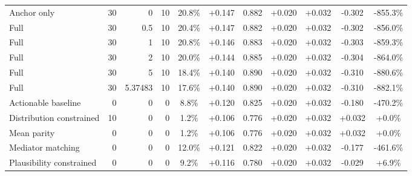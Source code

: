 \begin{table}[htbp]
\begin{tabular}{lrrrccccccc}
Anchor only & 30 & 0 & 10 & 20.8\% & +0.147 & 0.882 & +0.020 & +0.032 & -0.302 & -855.3\% \\
Full & 30 & 0.5 & 10 & 20.4\% & +0.147 & 0.882 & +0.020 & +0.032 & -0.302 & -856.0\% \\
Full & 30 & 1 & 10 & 20.8\% & +0.146 & 0.883 & +0.020 & +0.032 & -0.303 & -859.3\% \\
Full & 30 & 2 & 10 & 20.0\% & +0.144 & 0.885 & +0.020 & +0.032 & -0.304 & -864.0\% \\
Full & 30 & 5 & 10 & 18.4\% & +0.140 & 0.890 & +0.020 & +0.032 & -0.310 & -880.6\% \\
Full & 30 & 5.37483 & 10 & 17.6\% & +0.140 & 0.890 & +0.020 & +0.032 & -0.310 & -882.1\% \\
Actionable baseline & 0 & 0 & 0 & 8.8\% & +0.120 & 0.825 & +0.020 & +0.032 & -0.180 & -470.2\% \\
Distribution constrained & 10 & 0 & 0 & 1.2\% & +0.106 & 0.776 & +0.020 & +0.032 & +0.032 & +0.0\% \\
Mean parity & 0 & 0 & 0 & 1.2\% & +0.106 & 0.776 & +0.020 & +0.032 & +0.032 & +0.0\% \\
Mediator matching & 0 & 0 & 0 & 12.0\% & +0.121 & 0.822 & +0.020 & +0.032 & -0.177 & -461.6\% \\
Plausibility constrained & 0 & 0 & 0 & 9.2\% & +0.116 & 0.780 & +0.020 & +0.032 & -0.029 & +6.9\% \\
\bottomrule
\end{tabular}
\end{table}
